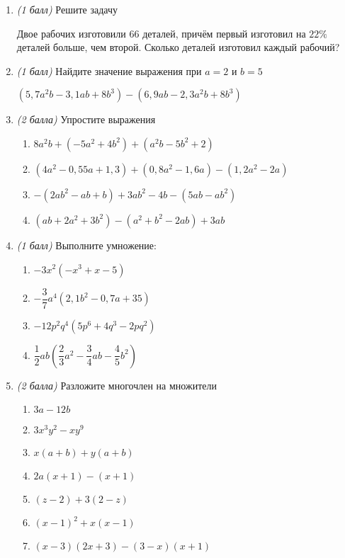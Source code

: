 \documentclass[12pt, a4paper]{article}
\begin{document}
	
	
	\begin{enumerate}
		\item \textit{(1 балл)} Решите задачу
		
		Двое рабочих изготовили $66$ деталей, причём первый изготовил на $22 \%$ деталей больше, чем второй. Сколько деталей изготовил каждый рабочий?
		\item \textit{(1 балл)} Найдите значение выражения при $a=2$ и $b=5$
		
		$(5,7a^2b-3,1ab+8b^3)-(6,9ab-2,3a^2b+8b^3)$
		\item \textit{(2 балла)} Упростите выражения
			\begin{enumerate}[label=\asbuk*)]
				\item $8a^2b+(-5a^2+4b^2)+(a^2b-5b^2+2)$
				\item $(4a^2-0,55a+1,3)+(0,8a^2-1,6a)-(1,2a^2-2a)$
				\item $-(2ab^2-ab+b)+3ab^2-4b-(5ab-ab^2)$
				\item $(ab+2a^2+3b^2)-(a^2+b^2-2ab)+3ab$
			\end{enumerate}
	\item \textit{(1 балл)} Выполните умножение:
	\begin{multicols}{2}
		\begin{enumerate}[label=\asbuk*)]
			\item $-3x^2(-x^3+x-5)$
			\item $-\dfrac{3}{7}a^4(2,1b^2-0,7a+35)$
			\item $-12p^2q^4(5p^6+4q^3-2pq^2)$
			\item $\dfrac{1}{2}ab(\dfrac{2}{3}a^2-\dfrac{3}{4}ab-\dfrac{4}{5}b^2)$
		\end{enumerate}
	\end{multicols}
	\item \textit{(2 балла)} Разложите многочлен на множители
	\begin{multicols}{2}
		\begin{enumerate}[label=\asbuk*)]
			\item $3a-12b$
			\item $3x^3y^2-xy^9$
			\item $x(a+b)+y(a+b)$
			\item $2a(x+1)-(x+1)$
			\item $(z-2)+3(2-z)$
			\item $(x-1)^2+x(x-1)$
			\item $(x-3)(2x+3)-(3-x)(x+1)$

\end{enumerate}
\end{multicols}
\end{enumerate}
\end{document}
